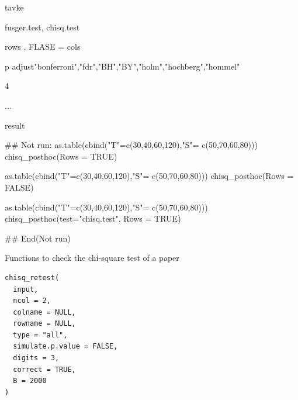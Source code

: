 \documentclass[a4paper]{book}
\begin{document}
%
\begin{Arguments}
\begin{ldescription}
\item[\code{tbl}] tavke

\item[\code{test}] fusger.test, chisq.test

\item[\code{Rows}] rows , FLASE = cols

\item[\code{control}] p adjust"bonferroni","fdr","BH","BY","holm","hochberg","hommel"

\item[\code{digits}] 4

\item[\code{...}] ...
\end{ldescription}
\end{Arguments}
%
\begin{Value}
result
\end{Value}
%
\begin{Examples}
\begin{ExampleCode}

## Not run: 
as.table(cbind("T"=c(30,40,60,120),"S"= c(50,70,60,80)))%
  chisq_posthoc(Rows  = TRUE)

as.table(cbind("T"=c(30,40,60,120),"S"= c(50,70,60,80)))%
  chisq_posthoc(Rows  = FALSE)

as.table(cbind("T"=c(30,40,60,120),"S"= c(50,70,60,80)))%
  chisq_posthoc(test="chisq.test", Rows  = TRUE)

## End(Not run)


\end{ExampleCode}
\end{Examples}
%
\begin{Description}
Functions to check the chi-square test of a paper
\end{Description}
%
\begin{Usage}
\begin{verbatim}
chisq_retest(
  input,
  ncol = 2,
  colname = NULL,
  rowname = NULL,
  type = "all",
  simulate.p.value = FALSE,
  digits = 3,
  correct = TRUE,
  B = 2000
)
\end{verbatim}
\end{Usage}
%
\end{document}
